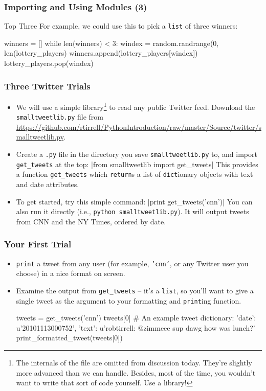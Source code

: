 \documentclass[10pt]{beamer}
\begin{document}
\begin{frame}[fragile]
  \frametitle{Importing and Using Modules (3)}
  \begin{block}{Top Three}
    For example, we could use this to pick a \texttt{list} of three winners:
    \begin{pythoncode}
  winners = []
  while len(winners) < 3:
    windex = random.randrange(0, len(lottery_players)
    winners.append(lottery_players[windex])
    lottery_players.pop(windex)
    \end{pythoncode}
  \end{block}
\end{frame}
    
\begin{frame}
  \frametitle{Three Twitter Trials}
  \begin{itemize}
    \item We will use a simple library\footnote{The internals of the file are omitted from discussion today. They're slightly more advanced than we can handle. Besides, most of the time, you wouldn't want to write that sort of code yourself. Use a library!} to read any public Twitter feed.
    Download the \texttt{smalltweetlib.py} file from 
      \footnotesize \href{https://github.com/rtirrell/PythonIntroduction/raw/master/Source/twitter/smalltweetlib.py}{https://github.com/rtirrell/PythonIntroduction/raw/master/Source/twitter/smalltweetlib.py}.
    \normalsize
    \item Create a \texttt{.py} file in the directory you save \texttt{smalltweetlib.py} to, and import \texttt{get\_tweets} at the top: 
      |from smalltweetlib import get_tweets|
      This provides a function \texttt{get\_tweets} which \texttt{return}s a list of \texttt{dict}ionary objects with text and date attributes.
    \item To get started, try this simple command: 
      |print get_tweets('cnn')|
      You can also run it directly (i.e., \texttt{python smalltweetlib.py}).
      It will output tweets from CNN and the NY Times, ordered by date.
  \end{itemize}
\end{frame}

\begin{frame}[fragile]
  \frametitle{Your First Trial}
  \begin{itemize}
    \item \texttt{print} a tweet from any user (for example, \texttt{'cnn'}, or any Twitter user you choose) in a nice format on screen.
    \item Examine the output from \texttt{get\_tweets} -- it's a \texttt{list}, so you'll want to give a single tweet as the argument to your formatting and \texttt{print}ing function. 
      \footnotesize
      \begin{pythoncode}
  tweets = get_tweets('cnn')
  tweets[0]
  # An example tweet dictionary:
  {
    'date': u'20101113000752', 
    'text': u'robtirrell: @zimmeee sup dawg how was lunch?'
  }
  print_formatted_tweet(tweets[0])
      \end{pythoncode}
        
  \end{itemize}
\end{frame}
\end{document}
